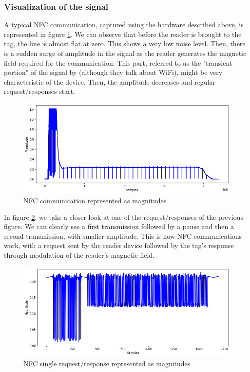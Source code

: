 \subsubsection{Visualization of the signal}

A typical NFC communication, captured using the hardware described above, is represented in figure \ref{fig:nfc-full}. We can observe that before the reader is brought to the tag, the line is almost flat at zero. This shows a very low noise level. Then, there is a sudden surge of amplitude in the signal as the reader generates the magnetic field required for the communication. This part, referred to as the "transient portion" of the signal by \textcite{xu_device_2015} (although they talk about WiFi), might be very characteristic of the device. Then, the amplitude decreases and regular request/responses start.

\begin{figure}[htp!]
  \centering
  \includegraphics[scale=0.5]{figures/data_whole-transmission.png}
  \caption{NFC communication represented as magnitudes}
  \label{fig:nfc-full}
\end{figure}

In figure \ref{fig:nfc-single}, we take a closer look at one of the request/responses of the previous figure. We can clearly see a first transmission followed by a pause and then a second transmission, with smaller amplitude. This is how NFC communications work, with a request sent by the reader device followed by the tag's response through modulation of the reader's magnetic field.

\begin{figure}[htp!]
  \centering
  \includegraphics[scale=0.5]{figures/data_single-request-response.png}
  \caption{NFC single request/response represented as magnitudes}
  \label{fig:nfc-single}
\end{figure}

